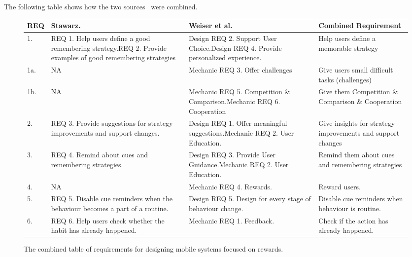 The following table shows how the two sources~\cite{thesis_kathy, article_taxonomy_motivational_affordances_meaningful} were combined.

\renewcommand{\arraystretch}{1.5} %
\begin{figure}[ht] %


\begin{center}
\begin{tabular}{ |p{.9cm}|p{4cm}|p{4.5cm}|p{4.5cm}| }
  \hline
  \textbf{REQ} & \textbf{Stawarz.~\cite{thesis_kathy}} & \textbf{Weiser et al.~\cite{article_taxonomy_motivational_affordances_meaningful}} & \textbf{Combined Requirement} \\ \hline %
  1.  & REQ 1. Help users define a good remembering strategy.\newline REQ 2. Provide examples of good remembering strategies & Design REQ 2. Support User Choice.\newline Design REQ 4. Provide personalized experience. & Help users define a memorable strategy \\ \hline
  1a. & N\/A & Mechanic REQ 3. Offer challenges & Give users small difficult tasks (challenges) \\ \hline
  1b. & N\/A & Mechanic REQ 5. Competition \& Comparison.\newline Mechanic REQ 6. Cooperation & Give them Competition \& Comparison \& Cooperation \\ \hline
  2.  & REQ 3. Provide suggestions for strategy improvements and support changes. & Design REQ 1. Offer meaningful suggestions.\newline Mechanic REQ 2. User Education. & Give insights for strategy improvements and support changes \\ \hline
  3.  & REQ 4. Remind about cues and remembering strategies. & Design REQ 3. Provide User Guidance.\newline Mechanic REQ 2. User Education. & Remind them about cues and remembering strategies \\ \hline
  4.  & N\/A & Mechanic REQ 4. Rewards. & Reward users. \\ \hline
  5.  & REQ 5. Disable cue reminders when the behaviour becomes a part of a routine. & Design REQ 5. Design for every stage of behaviour change. & Disable cue reminders when behaviour is routine. \\ \hline
  6.  & REQ 6. Help users check whether the habit has already happened. & Mechanic REQ 1. Feedback. & Check if the action has already happened. \\ \hline
\end{tabular}
\end{center}

    \caption{The combined table of requirements for designing mobile systems focused on rewards.}
    \label{fig:reqtable}
\end{figure}
\newpage

